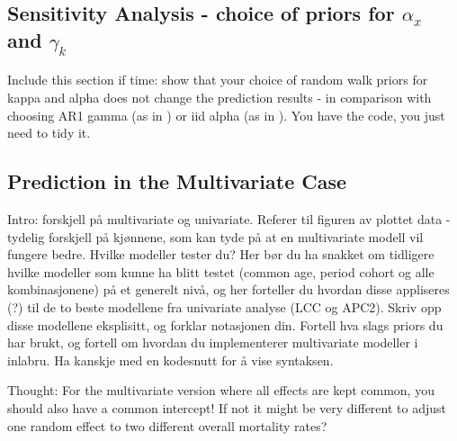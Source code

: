 \subsection{Sensitivity Analysis - choice of priors for $\alpha_x$ and $\gamma_k$}
\textcolor{myDarkGreen}{Include this section if time: show that your choice of random walk priors for kappa and alpha does not change the prediction results - in comparison with choosing AR1 gamma (as in \textcite{Wisniowski2015}) or iid alpha (as in \textcite{Wisniowski2015}). 
You have the code, you just need to tidy it. 
}

\newpage
\subsection{Prediction in the Multivariate Case}
\label{sec:pred-mv}

\textcolor{myDarkGreen}{
Intro: forskjell på multivariate og univariate. Referer til figuren av plottet data - tydelig forskjell på kjønnene, som kan tyde på at en multivariate modell vil fungere bedre. 
\newline \newline 
Hvilke modeller tester du? Her bør du ha snakket om tidligere hvilke modeller som kunne ha blitt testet (common age, period cohort og alle kombinasjonene) på et generelt nivå, og her forteller du hvordan disse appliseres (?) til de to beste modellene fra univariate analyse (LCC og APC2). Skriv opp disse modellene eksplisitt, og forklar notasjonen din. 
\newline \newline
Fortell hva slags priors du har brukt, og fortell om hvordan du implementerer multivariate modeller i inlabru. Ha kanskje med en kodesnutt for å vise syntaksen. 
}

\textcolor{myDarkGreen}{Thought: For the multivariate version where all effects are kept common, you should also have a common intercept! If not it might be very different to adjust one random effect to two different overall mortality rates?}


